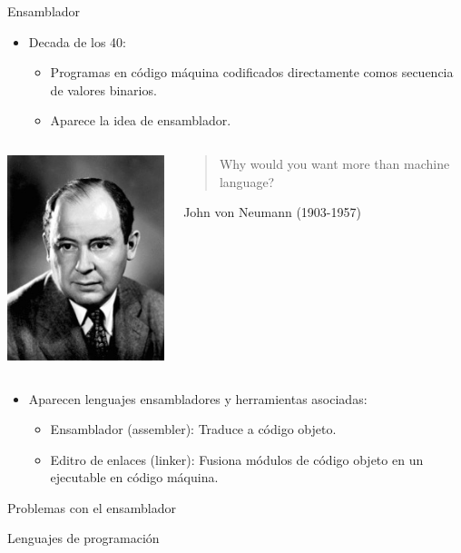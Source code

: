 \begin{frame}[t]{Ensamblador}
  \begin{itemize}
    \item Decada de los 40:
      \begin{itemize}
        \item Programas en código máquina codificados directamente comos secuencia de valores binarios.
        \item Aparece la idea de ensamblador.
      \end{itemize}
  \end{itemize}

\begin{columns}
  \begin{column}{0.2\textwidth}
    \includegraphics[width=.8\textwidth]{images/von-neumann.jpg}
  \end{column}
  \begin{column}{0.8\textwidth}
    \begin{quote}
      Why would you want more than machine language?
    \end{quote}
    John von Neumann (1903-1957)
  \end{column}
\end{columns}

\begin{itemize}
  \item Aparecen lenguajes ensambladores y herramientas asociadas:
    \begin{itemize}
      \item Ensamblador (assembler): Traduce a código objeto.
      \item Editro de enlaces (linker): Fusiona módulos de código objeto en un ejecutable en código máquina.
    \end{itemize}
\end{itemize}
\end{frame}

\begin{frame}[t]{Problemas con el ensamblador}
\end{frame}

\begin{frame}[t]{Lenguajes de programación}
\end{frame}


